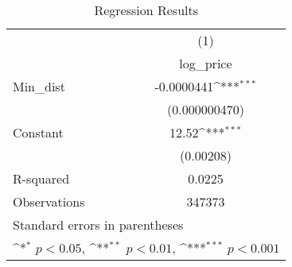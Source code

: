 {
\def\sym#1{\ifmmode^{#1}\else\(^{#1}\)\fi}
\begin{longtable}{l*{1}{c}}
\caption{Regression Results}\\
\toprule\endfirsthead\midrule\endhead\midrule\endfoot\endlastfoot
                    &\multicolumn{1}{c}{(1)}\\
                    &\multicolumn{1}{c}{log\_price}\\
\midrule
Min\_dist            &  -0.0000441\sym{***}\\
                    &(0.000000470)         \\
\addlinespace
Constant            &       12.52\sym{***}\\
                    &   (0.00208)         \\
\midrule
R-squared           &      0.0225         \\
Observations        &      347373         \\
\bottomrule
\multicolumn{2}{l}{\footnotesize Standard errors in parentheses}\\
\multicolumn{2}{l}{\footnotesize \sym{*} \(p<0.05\), \sym{**} \(p<0.01\), \sym{***} \(p<0.001\)}\\
\end{longtable}
\label{tab:full_simple_regression_results}
}
